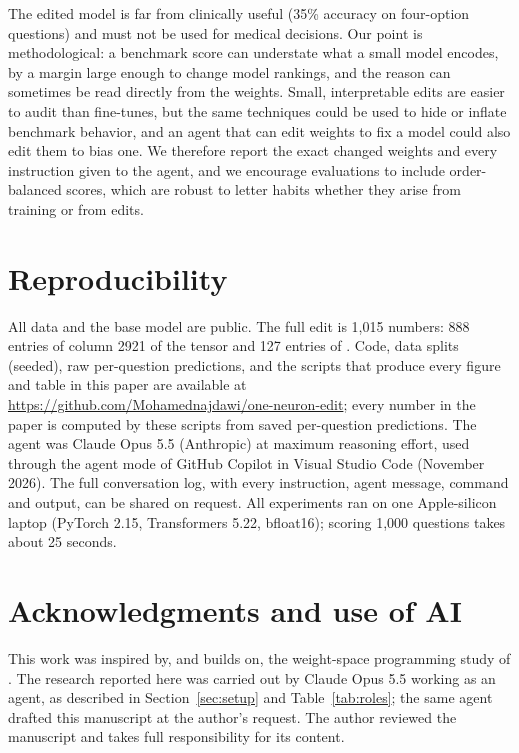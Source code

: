 \documentclass[11pt]{article}
\newcommand{\CodeURL}{\url{https://github.com/Mohamednajdawi/one-neuron-edit}}
\begin{document}
The edited model is far from clinically useful (35\% accuracy on four-option questions) and must not be used for medical decisions. Our point is methodological: a benchmark score can understate what a small model encodes, by a margin large enough to change model rankings, and the reason can sometimes be read directly from the weights. Small, interpretable edits are easier to audit than fine-tunes, but the same techniques could be used to hide or inflate benchmark behavior, and an agent that can edit weights to fix a model could also edit them to bias one. We therefore report the exact changed weights and every instruction given to the agent, and we encourage evaluations to include order-balanced scores, which are robust to letter habits whether they arise from training or from edits.

\section{Reproducibility}

All data and the base model are public. The full edit is 1{,}015 numbers: 888 entries of column 2921 of the tensor  and 127 entries of . Code, data splits (seeded), raw per-question predictions, and the scripts that produce every figure and table in this paper are available at \CodeURL; every number in the paper is computed by these scripts from saved per-question predictions. The agent was Claude Opus 5.5 (Anthropic) at maximum reasoning effort, used through the agent mode of GitHub Copilot in Visual Studio Code (November 2026). The full conversation log, with every instruction, agent message, command and output, can be shared on request. All experiments ran on one Apple-silicon laptop (PyTorch 2.15, Transformers 5.22, bfloat16); scoring 1{,}000 questions takes about 25 seconds.

\section*{Acknowledgments and use of AI}
This work was inspired by, and builds on, the weight-space programming study of \citet{takehi2026weightspace}. The research reported here was carried out by Claude Opus 5.5 working as an agent, as described in Section~\ref{sec:setup} and Table~\ref{tab:roles}; the same agent drafted this manuscript at the author's request. The author reviewed the manuscript and takes full responsibility for its content.
\end{document}
